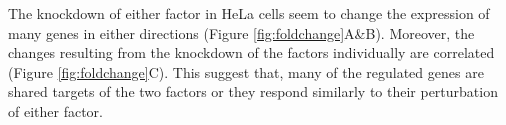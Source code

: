 \documentclass[9pt,a4paper,]{extarticle}
\newenvironment{Shaded}{\begin{snugshade}}{\end{snugshade}}
\newcommand{\CommentTok}[1]{\textcolor[rgb]{0.56,0.35,0.01}{\textit{#1}}}
\newcommand{\DataTypeTok}[1]{\textcolor[rgb]{0.13,0.29,0.53}{#1}}
\newcommand{\DecValTok}[1]{\textcolor[rgb]{0.00,0.00,0.81}{#1}}
\newcommand{\KeywordTok}[1]{\textcolor[rgb]{0.13,0.29,0.53}{\textbf{#1}}}
\newcommand{\NormalTok}[1]{#1}
\newcommand{\OperatorTok}[1]{\textcolor[rgb]{0.81,0.36,0.00}{\textbf{#1}}}
\newcommand{\OtherTok}[1]{\textcolor[rgb]{0.56,0.35,0.01}{#1}}
\newcommand{\StringTok}[1]{\textcolor[rgb]{0.31,0.60,0.02}{#1}}
\begin{document}
\begin{Shaded}
\end{Shaded}

The knockdown of either factor in HeLa cells seem to change the expression of many genes in either directions (Figure \ref{fig:foldchange}A\&B). Moreover, the changes resulting from the knockdown of the factors individually are correlated (Figure \ref{fig:foldchange}C). This suggest that, many of the regulated genes are shared targets of the two factors or they respond similarly to their perturbation of either factor.
\end{document}
